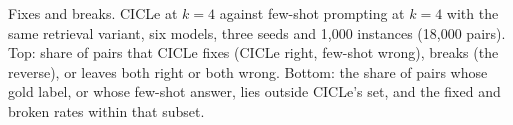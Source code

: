 \begin{table}[t]
  \centering
  \scriptsize
  \setlength{\tabcolsep}{3pt}
  \resizebox{\textwidth}{!}{}\par\medskip
  \resizebox{\textwidth}{!}{}
  \caption{Fixes and breaks. CICLe at $k = 4$ against few-shot prompting at $k = 4$ with the same retrieval variant, six models, three seeds and 1,000 instances (18,000 pairs). Top: share of pairs that CICLe fixes (CICLe right, few-shot wrong), breaks (the reverse), or leaves both right or both wrong. Bottom: the share of pairs whose gold label, or whose few-shot answer, lies outside CICLe's set, and the fixed and broken rates within that subset.}
  \label{tab:fixes}
\end{table}
